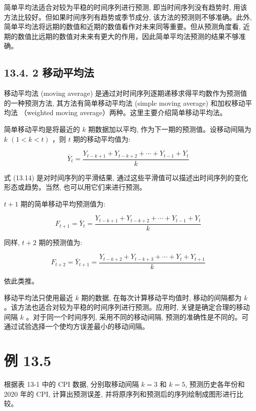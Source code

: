 \documentclass[10pt]{article}
\begin{document}
\begin{CJK*}{UTF8}{bsmi}
简单平均法适合对较为平稳的时间序列进行预测, 即当时间序列没有趋势时, 用该方法比较好。但如果时间序列有趋势或季节成分, 该方法的预测则不够准确。此外, 简单平均法将远期的数值和近期的数值看作对未来同等重要。但从预测角度看, 近期的数值比远期的数值对未来有更大的作用，因此简单平均法预测的结果不够准确。

\subsection*{13.4. 2 移动平均法}
移动平均法 (moving average) 是通过对时间序列逐期递移求得平均数作为预测值的一种预测方法, 其方法有简单移动平均法 (simple moving average) 和加权移动平均法 （weighted moving average）两种。这里主要介绍简单移动平均法。

简单移动平均是将最近的 $k$ 期数据加以平均, 作为下一期的预测值。设移动间隔为 $k$ $(1<k<t)$ ，则 $t$ 期的移动平均值为:


\begin{equation*}
\bar{Y}_{t}=\frac{Y_{t-k+1}+Y_{t-k+2}+\cdots+Y_{t-1}+Y_{t}}{k} \tag{13.14}
\end{equation*}


式 (13.14) 是对时间序列的平滑结果, 通过这些平滑值可以描述出时间序列的变化形态或趋势。当然, 也可以用它们来进行预测。

$t+1$ 期的简单移动平均预测值为:


\begin{equation*}
F_{t+1}=\bar{Y}_{t}=\frac{Y_{t-k+1}+Y_{t-k+2}+\cdots+Y_{t-1}+Y_{t}}{k} \tag{13.15}
\end{equation*}


同样, $t+2$ 期的预测值为:


\begin{equation*}
F_{t+2}=\bar{Y}_{t+1}=\frac{Y_{t-k+2}+Y_{t-k+3}+\cdots+Y_{t}+Y_{t+1}}{k} \tag{13.16}
\end{equation*}


依此类推。

移动平均法只使用最近 $k$ 期的数据, 在每次计算移动平均值时, 移动的间隔都为 $k$ 。该方法也适合对较为平稳的时间序列进行预测。应用时, 关键是确定合理的移动间隔 $k$ 。对于同一个时间序列, 采用不同的移动间隔, 预测的准确性是不同的。可通过试验选择一个使均方误差最小的移动间隔。

\section*{例 13.5}
根据表 13-1 中的 CPI 数据, 分别取移动间隔 $k=3$ 和 $k=5$, 预测历史各年份和 2020 年的 CPI, 计算出预测误差, 并将原序列和预测后的序列绘制成图形进行比较。


\end{CJK*}
\end{document}
